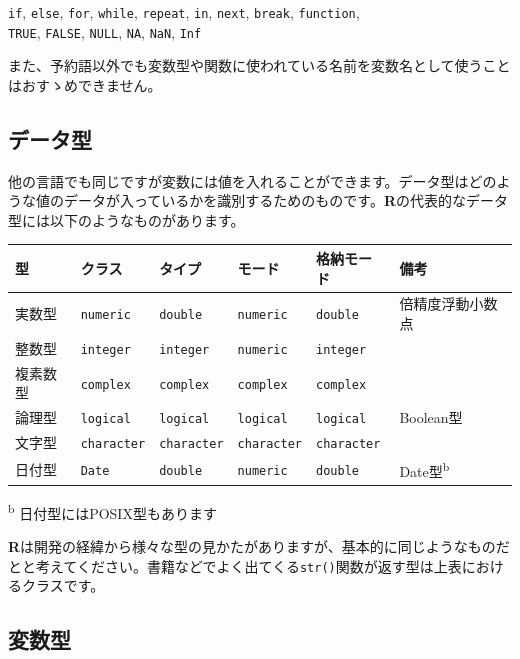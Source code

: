 \documentclass[
  12pt,
]{book}
\begin{document}
\texttt{if}, \texttt{else}, \texttt{for}, \texttt{while}, \texttt{repeat}, \texttt{in}, \texttt{next}, \texttt{break}, \texttt{function},\\
\texttt{TRUE}, \texttt{FALSE}, \texttt{NULL}, \texttt{NA}, \texttt{NaN}, \texttt{Inf}

また、予約語以外でも変数型や関数に使われている名前を変数名として使うことはおすゝめできません。

\hypertarget{ux30c7ux30fcux30bfux578b}{%
\subsection{データ型}\label{ux30c7ux30fcux30bfux578b}}

他の言語でも同じですが変数には値を入れることができます。データ型はどのような値のデータが入っているかを識別するためのものです。\textbf{R}の代表的なデータ型には以下のようなものがあります。

\begin{longtable}[]{@{}llllll@{}}
\toprule
型 & クラス & タイプ & モード & 格納モード & 備考 \\
\midrule
\endhead
実数型 & \texttt{numeric} & \texttt{double} & \texttt{numeric} & \texttt{double} & 倍精度浮動小数点 \\
整数型 & \texttt{integer} & \texttt{integer} & \texttt{numeric} & \texttt{integer} & \\
複素数型 & \texttt{complex} & \texttt{complex} & \texttt{complex} & \texttt{complex} & \\
論理型 & \texttt{logical} & \texttt{logical} & \texttt{logical} & \texttt{logical} & Boolean型 \\
文字型 & \texttt{character} & \texttt{character} & \texttt{character} & \texttt{character} & \\
日付型 & \texttt{Date} & \texttt{double} & \texttt{numeric} & \texttt{double} & Date型\textsuperscript{b} \\
\bottomrule
\end{longtable}

\textsuperscript{b} 日付型にはPOSIX型もあります

\textbf{R}は開発の経緯から様々な型の見かたがありますが、基本的に同じようなものだとと考えてください。書籍などでよく出てくる\texttt{str()}関数が返す型は上表におけるクラスです。

\hypertarget{ux5909ux6570ux578b}{%
\subsection{変数型}\label{ux5909ux6570ux578b}}
\end{document}
